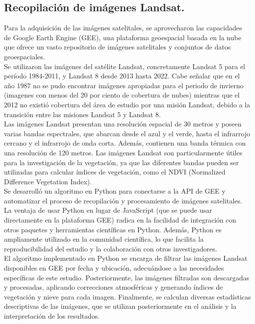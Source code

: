 {\small
\subsection{\textbf{Recopilación de imágenes Landsat.}}
Para la adquisición de las imágenes satelitales, se aprovecharon las capacidades de Google Earth Engine (GEE), una plataforma geoespacial basada en la nube que ofrece un vasto repositorio de imágenes satelitales y conjuntos de datos geoespaciales. \\

Se utilizaron las imágenes del satélite Landsat, concretamente Landsat 5 para el período 1984-2011, y Landsat 8 desde 2013 hasta 2022. Cabe señalar que en el año 1987 no se pudo encontrar imágenes apropiadas para el periodo de invierno (imagenes con menos del 20 por ciento de cobertura de nubes) mientras que el  2012 no existió cobertura del área de estudio por una misión Landsat, debido a la transición entre las misiones Landsat 5 y Landsat 8.\\

Las imágenes Landsat presentan una resolución espacial de 30 metros y poseen varias bandas espectrales, que abarcan desde el azul y el verde, hasta el infrarrojo cercano y el infrarrojo de onda corta. Además, contienen una banda térmica con una resolución de 120 metros. Las imágenes Landsat son particularmente útiles para la investigación de la vegetación, ya que las diferentes bandas pueden ser utilizadas para calcular índices de vegetación, como el NDVI (Normalized Difference Vegetation Index).\\

Se desarrolló un algoritmo en Python para conectarse a la API de GEE y automatizar el proceso de recopilación y procesamiento de imágenes satelitales. La ventaja de usar Python en lugar de JavaScript (que se puede usar directamente en la plataforma GEE) radica en la facilidad de integración con otros paquetes y herramientas científicas en Python. Además, Python es ampliamente utilizado en la comunidad científica, lo que facilita la reproducibilidad del estudio y la colaboración con otros investigadores. \\

El algoritmo implementado en Python se encarga de filtrar las imágenes Landsat disponibles en GEE por fecha y ubicación, adecuándose a las necesidades específicas de este estudio. Posteriormente, las imágenes filtradas son descargadas y procesadas, aplicando correcciones atmosféricas y generando índices de vegetación y nieve para cada imagen. Finalmente, se calculan diversas estadísticas descriptivas de las imágenes, que se utilizan posteriormente en el análisis y la interpretación de los resultados.\\
}

